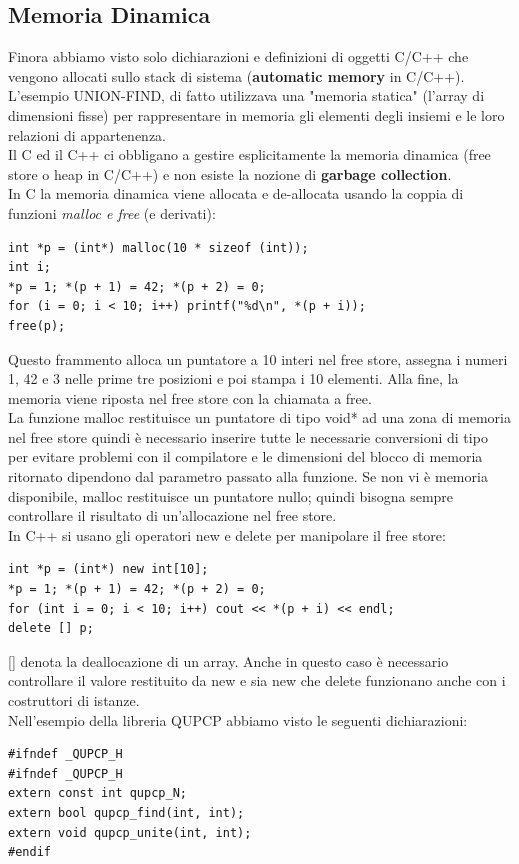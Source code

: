 \documentclass[a4paper,12pt, oneside]{book}
\begin{document}
\subsection{Memoria Dinamica}
Finora abbiamo visto solo dichiarazioni e definizioni di oggetti C/C++ che vengono allocati sullo stack di sistema (\textbf{automatic memory} in C/C++). L'esempio UNION-FIND, di fatto utilizzava una "memoria statica"
(l'array di dimensioni fisse) per rappresentare in memoria gli elementi
degli insiemi e le loro relazioni di appartenenza.\\
Il C ed il C++ ci obbligano a gestire esplicitamente la memoria dinamica
(free store o heap in C/C++) e non esiste la nozione di \textbf{garbage collection}.\\
In C la memoria dinamica viene allocata e de-allocata usando la coppia
di funzioni \textit{malloc e free }(e derivati):
\begin{verbatim}
int *p = (int*) malloc(10 * sizeof (int));
int i;
*p = 1; *(p + 1) = 42; *(p + 2) = 0;
for (i = 0; i < 10; i++) printf("%d\n", *(p + i));
free(p);
\end{verbatim}
Questo frammento alloca un puntatore a 10 interi nel free store, assegna i numeri 1, 42 e 3 nelle prime tre posizioni e poi stampa i 10 elementi. Alla fine, la memoria viene riposta nel free store con la chiamata a free.\\
La funzione malloc restituisce un puntatore di tipo void* ad
una zona di memoria nel free store quindi è necessario inserire tutte le necessarie conversioni di tipo
per evitare problemi con il compilatore e le dimensioni del blocco di memoria ritornato dipendono dal
parametro passato alla funzione. Se non vi è memoria disponibile, malloc restituisce un puntatore
nullo; quindi bisogna sempre controllare il risultato di un'allocazione nel free store.\\
In C++ si usano gli operatori new e delete per manipolare il
free store:
\begin{verbatim}
int *p = (int*) new int[10];
*p = 1; *(p + 1) = 42; *(p + 2) = 0;
for (int i = 0; i < 10; i++) cout << *(p + i) << endl;
delete [] p;
\end{verbatim}
[] denota la deallocazione di un array. Anche in questo caso è necessario controllare il valore restituito
da new e sia new che delete funzionano anche con i costruttori di istanze.\\
Nell'esempio della libreria QUPCP abbiamo visto le seguenti
dichiarazioni:
\begin{verbatim}
#ifndef _QUPCP_H
#ifndef _QUPCP_H
extern const int qupcp_N;
extern bool qupcp_find(int, int);
extern void qupcp_unite(int, int);
#endif
\end{verbatim}
\end{document}
